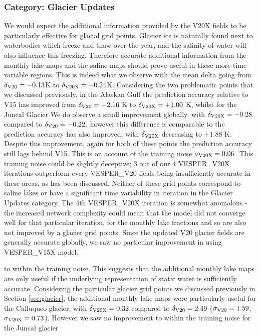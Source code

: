 \documentclass[hess, twostagejnl]{copernicus}
\providecommand{\DIFadd}[1]{{\protect\color{blue} \sf #1}} %
\providecommand{\DIFdel}[1]{{\protect\color{red} \scriptsize #1}} %
\providecommand{\DIFaddbegin}{} %
\providecommand{\DIFaddend}{} %
\providecommand{\DIFdelbegin}{} %
\providecommand{\DIFdelend}{} %
\begin{document}
\subsubsection{Category: Glacier Updates}
We would expect the additional information provided by \DIFaddbegin \DIFadd{the }\DIFaddend V20X \DIFaddbegin \DIFadd{fields }\DIFaddend to be particularly effective for glacial grid points. Glacier ice is naturally found next to waterbodies which freeze and thaw over the year, and the salinity of water will also influence this freezing. Therefore accurate additional information from the monthly lake maps and the saline maps should prove useful in these more time variable regions. \DIFdelbegin \DIFdel{This is indeed what we observe with the mean delta going from $\delta_{\rm V20} = -0.13$K to $\delta_{\rm V20X}= -0.24$K.  Considering the two problematic points that we discussed previously, in the Alaskan Gulf the prediction accuracy relative to V15 has improved from $\delta_{\rm V20} = +2.16$ K to $\delta_{\rm V20X}= +1.00$ K, whilst for the Juncal Glacier }\DIFdelend \DIFaddbegin \DIFadd{We do observe a small improvement globally, with $\delta_{\rm V20X} = -0.28$ compared to $\delta_{\rm V20} = -0.22$, however this difference is comparable to }\DIFaddend the \DIFdelbegin \DIFdel{prediction accuracy has also improved, with $\delta_{\rm V20X}$ decreasing to $+1.88$ K. Despite this improvement, again for both of these points the prediction accuracy still lags behind V15. This is on account of the }\DIFdelend \DIFaddbegin \DIFadd{training noise $\sigma_{\rm V20X} = 0.06$. This training noise could be slightly deceptive;  3 out of our 4 VESPER\_V20X iterations outperform every VESPER\_}\DIFaddend V20 \DIFdelbegin \DIFdel{fields being insufficiently accurate in these areas, as has been discussed. Neither of these grid points correspond to saline lakes or have a significant time variability in }\DIFdelend \DIFaddbegin \DIFadd{iteration in the Glacier Updates category. The 4th VESPER\_V20X iteration is somewhat anomalous - the increased network complexity could mean that the model did not converge well for that particular iteration, for }\DIFaddend the \DIFdelbegin \DIFdel{monthly lake fractions and so are also not improved by a }\DIFdelend \DIFaddbegin \DIFadd{glacier grid points. Since the updated V20 glacier fields are generally accurate globally, we saw no particular  improvement in using VESPER\_}\DIFaddend V15X \DIFdelbegin \DIFdel{model. }\DIFdelend \DIFaddbegin \DIFadd{to within the training noise. This suggests that the additional monthly lake maps are only useful if the underlying representation of static water is sufficiently accurate. Considering the particular glacier grid points we discussed previously in Section \ref{sec:glacier}, the additional monthly lake maps were particularly useful for the Calluqueo glacier, with $\delta_{\rm V20X} = 0.32$ compared to $\delta_{\rm V20} = 2.49$ ($\sigma_{\rm V20}=1.59$, $\sigma_{\rm V20X}=0.73$). However we saw no improvement to within the training noise for the Juncal glacier 

}\DIFaddend 
\end{document}
